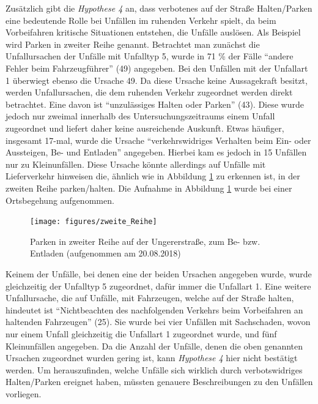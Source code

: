 Zusätzlich gibt die \textit{Hypothese 4} an, dass verbotenes auf der Straße Halten/Parken eine bedeutende Rolle bei Unfällen im ruhenden Verkehr spielt, da beim Vorbeifahren kritische Situationen entstehen, die Unfälle auslösen. Als Beispiel wird Parken in zweiter Reihe genannt. Betrachtet man zunächst die Unfallursachen der Unfälle mit Unfalltyp 5, wurde in 71 \% der Fälle \enquote{andere Fehler beim Fahrzeugführer} (49) angegeben. Bei den Unfällen mit der Unfallart 1 überwiegt ebenso die Ursache 49. Da diese Ursache keine Aussagekraft besitzt, werden Unfallursachen, die dem ruhenden Verkehr zugeordnet werden direkt betrachtet. Eine davon ist \enquote{unzulässiges Halten oder Parken} (43). Diese wurde jedoch nur zweimal innerhalb des Untersuchungszeitraums einem Unfall zugeordnet und liefert daher keine ausreichende Auskunft. Etwas häufiger, insgesamt 17-mal, wurde die Ursache \enquote{verkehrswidriges Verhalten beim Ein- oder Aussteigen, Be- und Entladen} angegeben. Hierbei kam es jedoch in 15 Unfällen nur zu Kleinunfällen. Diese Ursache könnte allerdings auf Unfälle mit Lieferverkehr hinweisen die, ähnlich wie in Abbildung \ref{fig:Parken_zweite_Reihe} zu erkennen ist, in der zweiten Reihe parken/halten. Die Aufnahme in Abbildung \ref{fig:Parken_zweite_Reihe} wurde bei einer Ortsbegehung aufgenommen.

\begin{savenotes}
	\begin{figure}[H]
		\centering
		\texttt{[image: figures/zweite\_Reihe]}
		\caption[Parken in zweiter Reihe auf der Ungererstraße, zum Be- bzw. Entladen]{Parken in zweiter Reihe auf der Ungererstraße, zum Be- bzw. Entladen (aufgenommen am 20.08.2018)}\label{fig:Parken_zweite_Reihe}
	\end{figure}
\end{savenotes}

Keinem der Unfälle, bei denen eine der beiden Ursachen angegeben wurde, wurde gleichzeitig der Unfalltyp 5 zugeordnet, dafür immer die Unfallart 1. Eine weitere Unfallursache, die auf Unfälle, mit Fahrzeugen, welche auf der Straße halten, hindeutet ist \enquote{Nichtbeachten des nachfolgenden Verkehrs beim Vorbeifahren an haltenden Fahrzeugen} (25). Sie wurde bei vier Unfällen mit Sachschaden, wovon nur einem Unfall gleichzeitig die Unfallart 1 zugeordnet wurde, und fünf Kleinunfällen angegeben. Da die Anzahl der Unfälle, denen die oben genannten Ursachen zugeordnet wurden gering ist, kann \textit{Hypothese 4} hier nicht bestätigt werden. Um herauszufinden, welche Unfälle sich wirklich durch verbotswidriges Halten/Parken ereignet haben, müssten genauere Beschreibungen zu den Unfällen vorliegen. %

